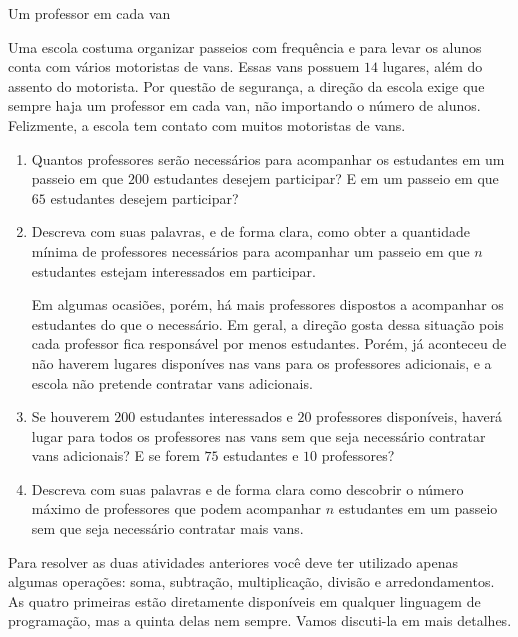 \begin{task}{Um professor em cada van}
\label{comp-task5}

Uma escola costuma organizar passeios com frequência e para levar os alunos conta com vários motoristas de vans. Essas vans possuem $14$ lugares, além do assento do motorista. Por questão de segurança, a direção da escola exige que sempre haja um professor em cada van, não importando o número de alunos. Felizmente, a escola tem contato com muitos motoristas de vans.

\begin{enumerate}
\item Quantos professores serão necessários para acompanhar os estudantes em um passeio em que $200$ estudantes desejem participar? E em um passeio em que $65$ estudantes desejem participar?

\item Descreva com suas palavras, e de forma clara, como obter a quantidade mínima de professores necessários para acompanhar um passeio em que $n$ estudantes estejam interessados em participar.

Em algumas ocasiões, porém, há mais professores dispostos a acompanhar os estudantes do que o necessário. Em geral, a direção gosta dessa situação pois cada professor fica responsável por menos estudantes. Porém, já aconteceu de não haverem lugares disponíves nas vans para os professores adicionais, e a escola não pretende contratar vans adicionais.

\item Se houverem $200$ estudantes interessados e $20$ professores disponíveis, haverá lugar para todos os professores nas vans sem que seja necessário contratar vans adicionais? E se forem $75$ estudantes e $10$ professores?

\item Descreva com suas palavras e de forma clara como descobrir o número máximo de professores que podem acompanhar $n$ estudantes em um passeio sem que seja necessário contratar mais vans.
\end{enumerate}

\end{task}

\label{comp-arr3}

Para resolver as duas atividades anteriores você deve ter utilizado apenas algumas operações: soma, subtração, multiplicação, divisão e arredondamentos. As quatro primeiras estão diretamente disponíveis em qualquer linguagem de programação, mas a quinta delas nem sempre. Vamos discuti-la em mais detalhes.

